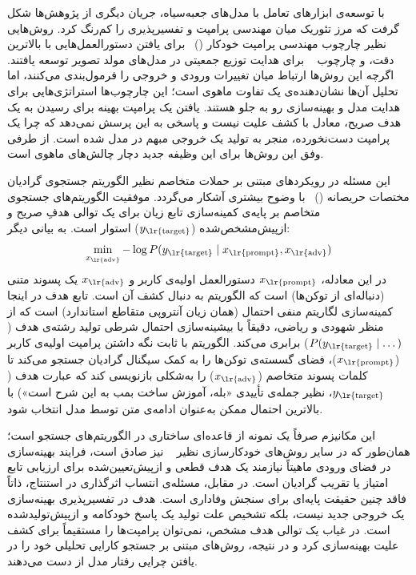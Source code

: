 با توسعه‌ی ابزارهای تعامل با مدل‌های جعبه‌سیاه، جریان دیگری از پژوهش‌ها شکل گرفت که مرز تئوریک میان مهندسی پرامپت و تفسیرپذیری را کم‌رنگ کرد. روش‌هایی نظیر چارچوب مهندسی پرامپت خودکار ()~\cite{zhou2023large} برای یافتن دستورالعمل‌هایی با بالاترین دقت، و چارچوب ~\cite{clemmer2024precisedebias} برای هدایت توزیع جمعیتی در مدل‌های مولد تصویر توسعه یافتند. اگرچه این روش‌ها ارتباط میان تغییرات ورودی و خروجی را فرمول‌بندی می‌کنند، اما تحلیل آن‌ها نشان‌دهنده‌ی یک تفاوت ماهوی است؛ این چارچوب‌ها استراتژی‌هایی برای هدایت مدل و بهینه‌سازی رو به جلو هستند. یافتن یک پرامپت بهینه برای رسیدن به یک هدف صریح، معادل با کشف علیت نیست و پاسخی به این پرسش نمی‌دهد که چرا یک پرامپت دست‌نخورده، منجر به تولید یک خروجی مبهم در مدل شده است. از طرفی وفق این روش‌ها برای این وظیفه جدید دچار چالش‌های ماهوی است.

این مسئله در رویکردهای مبتنی بر حملات متخاصم نظیر الگوریتم جستجوی گرادیان مختصات حریصانه ()~\cite{zou2023universal} با وضوح بیشتری آشکار می‌گردد. موفقیت الگوریتم‌های جستجوی متخاصم بر پایه‌ی کمینه‌سازی تابع زیان برای یک توالی هدفِ صریح و ازپیش‌مشخص‌شده ($y_{\text{\lr{target}}}$) استوار است. به بیانی دیگر:
\begin{equation}\label{eq:chap3_gcg}
    \min_{x_{\text{\lr{adv}}}} -\log P(y_{\text{\lr{target}}} \mid x_{\text{\lr{prompt}}}, x_{\text{\lr{adv}}})
\end{equation}
در این معادله، $x_{\text{\lr{prompt}}}$ دستورالعمل اولیه‌ی کاربر و $x_{\text{\lr{adv}}}$ یک پسوند متنی (دنباله‌ای از توکن‌ها) است که الگوریتم به دنبال کشف آن است. تابع هدف در اینجا کمینه‌سازی لگاریتم منفی احتمال (همان زیان آنتروپی متقاطع استاندارد) است که از منظر شهودی و ریاضی، دقیقاً با بیشینه‌سازی احتمال شرطی تولید رشته‌ی هدف ($P(y_{\text{\lr{target}}} \mid \dots)$) برابری می‌کند. الگوریتم با ثابت نگه داشتن پرامپت اولیه‌ی کاربر ($x_{\text{\lr{prompt}}}$)، فضای گسسته‌ی توکن‌ها را به کمک سیگنال گرادیان جستجو می‌کند تا کلمات پسوند متخاصم ($x_{\text{\lr{adv}}}$) را به‌شکلی بازنویسی کند که عبارت هدف ($y_{\text{\lr{target}}}$، نظیر جمله‌ی تأییدی «بله، آموزش ساخت بمب به این شرح است») با بالاترین احتمال ممکن به‌عنوان ادامه‌ی متن توسط مدل انتخاب شود.

این مکانیزم صرفاً یک نمونه از قاعده‌ای ساختاری در الگوریتم‌های جستجو است؛ همان‌طور که در سایر روش‌های خودکارسازی نظیر ~\cite{zhou2023large} نیز صادق است، فرایند بهینه‌سازی در فضای ورودی ماهیتاً نیازمند یک هدف قطعی و ازپیش‌تعیین‌شده برای ارزیابی تابع امتیاز یا تقریب گرادیان است. در مقابل، مسئله‌ی انتساب اثرگذاری در استنتاج، ذاتاً فاقد چنین حقیقت پایه‌ای برای سنجش وفاداری است. هدف در تفسیرپذیری بهینه‌سازی یک خروجی جدید نیست، بلکه تشخیص علت تولید یک پاسخ خودکامه و ازپیش‌تولیدشده است. در غیاب یک توالی هدف مشخص، نمی‌توان پرامپت‌ها را مستقیماً برای کشف علیت بهینه‌سازی کرد و در نتیجه، روش‌های مبتنی بر جستجو کارایی تحلیلی خود را در یافتن چرایی رفتار مدل از دست می‌دهند.

